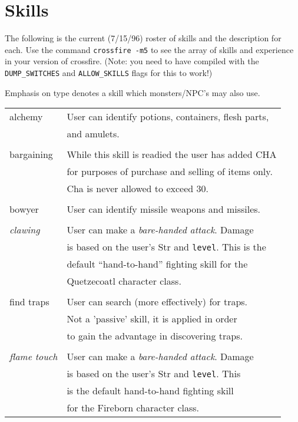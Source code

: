 \chapter{Skills}
\label{app:skills}

The following is the current (7/15/96) roster of skills and the
description for each. Use the command {\tt crossfire -m5} to see the array
of skills and experience in your version of crossfire.
(Note: you need to have compiled with the {\tt DUMP\_SWITCHES} and
{\tt ALLOW\_SKILLS} flags for this to work!)

Emphasis on type denotes a skill which monsters/NPC's may also use.

\begin{longtable}{|p{4cm}|p{9cm}|} \hline
alchemy &  User can identify potions, containers, flesh parts, \\
	&  and amulets. \\
 &  \\
bargaining   	& While this skill is readied the user has added CHA \\
	 	& for purposes of purchase and selling of items only. \\
		& Cha is never allowed to exceed 30. \\
 &  \\
bowyer  &  User can identify missile weapons and missiles. \\
 &  \\
{\em clawing}	& User can make a {\em bare-handed attack}. Damage \\
                & is based on the user's Str and {\tt level}. This is the \\
		& default ``hand-to-hand'' fighting skill for the  \\
		& Quetzecoatl character class. \\
 &  \\
find traps	& User can search (more effectively) for traps. \\
		& Not a 'passive' skill, it is applied in order \\
		& to gain the advantage in discovering traps. \\
 &  \\
{\em flame touch} & User can make a {\em bare-handed attack}. Damage \\
		& is based on the user's Str and {\tt level}. This \\
		& is the default hand-to-hand fighting skill \\
		& for the Fireborn character class. \\

\end{longtable}
